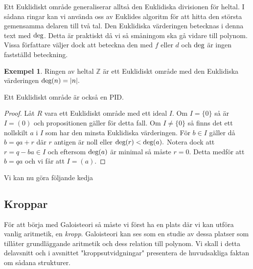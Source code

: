 \documentclass{article}
\newcommand{\grad}[0]{\textnormal{deg}}
\theoremstyle{definition}
\newtheorem{exmp}[thm]{Exempel}
\begin{document}
Ett Euklidiskt område generaliserar alltså den Euklidiska divisionen för heltal. I sådana ringar kan vi använda oss av Euklides algoritm för 
att hitta den största gemensamma delaren till två tal. Den Euklidiska värderingen betecknas i denna text med $\grad$. Detta är praktiskt 
då vi så småningom ska gå vidare till polynom. Vissa författare väljer dock att beteckna den med $f$ eller $d$ och $\grad$ är ingen fastställd beteckning.
\begin{exmp}
  Ringen av heltal $\mathbb{Z}$ är ett Euklidiskt område med den Euklidiska värderingen $\grad (n) = |n|.$
\end{exmp}

\hypertarget{eukpid}{}
\begin{myprop}{}{}
  Ett Euklidiskt område är också en PID.
\end{myprop}
\begin{proof}
  Låt $R$ vara ett Euklidiskt område med ett ideal $I$. Om $I = \{0\}$ så är $I = (0)$ och propositionen gäller för detta fall. 
  Om $I \neq \{0\}$ så finns det ett nollskilt $a$ i $I$ som har den minsta Euklidiska värderingen. För $b \in I$ gäller då 
  $b = qa + r$ där $r$ antigen är noll eller $\grad (r)  < \grad (a).$ Notera dock att $r = q-ba \in I$ och eftersom $\grad (a)$ är minimal 
  så måste $r = 0$. Detta medför att $b = qa$ och vi får att $I = (a).$
\end{proof}
Vi kan nu göra följande kedja


\subsection{Kroppar}
För att börja med Galoisteori så måste vi först ha en plats där vi kan utföra vanlig aritmetik, en \textit{kropp}. Galoisteori kan ses som en studie 
av dessa platser som tillåter grundläggande aritmetik och dess relation till polynom. Vi skall i detta delavsnitt och i avsnittet "kroppsutvidgningar" 
presentera de huvudsakliga faktan om 
sådana strukturer. 
\end{document}

